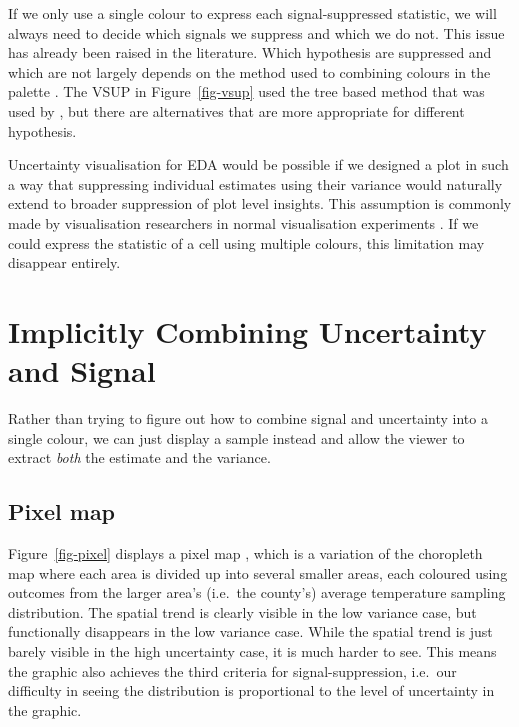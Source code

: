 \documentclass[
  12pt]{article}
\begin{document}
If we only use a single colour to express each signal-suppressed
statistic, we will always need to decide which signals we suppress and
which we do not. This issue has already been raised in the literature.
Which hypothesis are suppressed and which are not largely depends on the
method used to combining colours in the palette \citep{Kay2019}. The
VSUP in Figure~\ref{fig-vsup} used the tree based method that was used
by \citet{Correll2018}, but there are alternatives that are more
appropriate for different hypothesis.

Uncertainty visualisation for EDA would be possible if we designed a
plot in such a way that suppressing individual estimates using their
variance would naturally extend to broader suppression of plot level
insights. This assumption is commonly made by visualisation researchers
in normal visualisation experiments \citep{North2006}. If we could
express the statistic of a cell using multiple colours, this limitation
may disappear entirely.

\section{Implicitly Combining Uncertainty and
Signal}\label{implicitly-combining-uncertainty-and-signal}

Rather than trying to figure out how to combine signal and uncertainty
into a single colour, we can just display a sample instead and allow the
viewer to extract \emph{both} the estimate and the variance.

\subsection{Pixel map}\label{pixel-map}

Figure~\ref{fig-pixel} displays a pixel map \citep{Lucchesi2021}, which
is a variation of the choropleth map where each area is divided up into
several smaller areas, each coloured using outcomes from the larger
area's (i.e.~the county's) average temperature sampling distribution.
The spatial trend is clearly visible in the low variance case, but
functionally disappears in the low variance case. While the spatial
trend is just barely visible in the high uncertainty case, it is much
harder to see. This means the graphic also achieves the third criteria
for signal-suppression, i.e.~our difficulty in seeing the distribution
is proportional to the level of uncertainty in the graphic.
\end{document}
